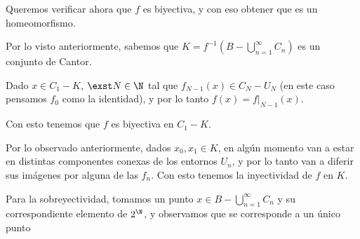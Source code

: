 Queremos verificar ahora que $f$ es biyectiva, y con eso obtener que es un homeomorfismo. 

Por lo visto anteriormente, sabemos que $K=f^{-1}(B-\bigcup\limits_{n=1}^{\infty}C_n)$ es un conjunto de Cantor. 

Dado $x\in C_1- K$, $\exst N\in\N$ tal que $f_{N-1}(x)\in C_{N}-U_N$ (en este caso pensamos $f_0$ como la identidad), y por lo tanto $f(x)=f|_{N-1}(x)$. 
            
Con esto tenemos que $f$ es biyectiva en $C_1- K$. 

Por lo observado anteriormente, dados $x_0, x_1\in K$, en algún momento van a estar en distintas componentes conexas de los entornos $U_n$, y por lo tanto van a diferir sus imágenes por alguna de las $f_n$. Con esto tenemos la inyectividad de $f$ en $K$. 

Para la sobreyectividad, tomamos un punto $x\in B-\bigcup\limits_{n=1}^{\infty}C_n$ y su correspondiente elemento de $2^\N$, y observamos que se corresponde a un único punto 
